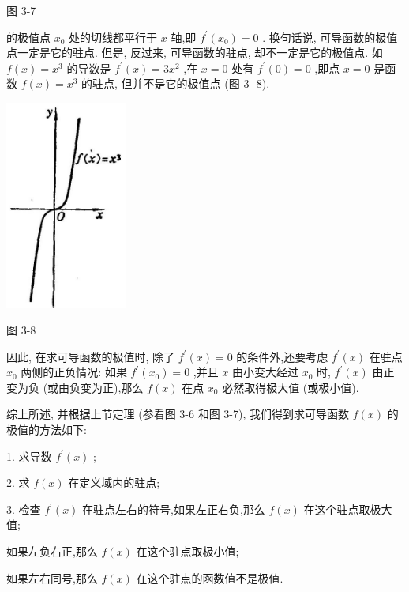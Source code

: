 \documentclass[lang=cn,newtx,12pt,scheme=chinese]{elegantbook}
\begin{document}
图 3-7

的极值点 \({x}_{0}\) 处的切线都平行于 \(x\) 轴,即 \({f}^{\prime }\left( {x}_{0}\right) = 0\) . 换句话说, 可导函数的极值点一定是它的驻点. 但是, 反过来, 可导函数的驻点, 却不一定是它的极值点. 如 \(f\left( x\right) = {x}^{3}\) 的导数是 \({f}^{\prime }\left( x\right) = 3{x}^{2}\) ,在 \(x = 0\) 处有 \({f}^{\prime }\left( 0\right) = 0\) ,即点 \(x = 0\) 是函数 \(f\left( x\right) = {x}^{3}\) 的驻点, 但并不是它的极值点 (图 3- 8).

\begin{center}
\includegraphics[max width=0.3\textwidth]{images/01912c18-5c3f-733d-b775-749ba9897a9d_141_203287.jpg}
\end{center}

图 3-8

因此, 在求可导函数的极值时, 除了 \({f}^{\prime }\left( x\right) = 0\) 的条件外,还要考虑 \({f}^{\prime }\left( x\right)\) 在驻点 \({x}_{0}\) 两侧的正负情况: 如果 \({f}^{\prime }\left( {x}_{0}\right) = 0\) ,并且 \(x\) 由小变大经过 \({x}_{0}\) 时, \({f}^{\prime }\left( x\right)\) 由正变为负 (或由负变为正),那么 \(f\left( x\right)\) 在点 \({x}_{0}\) 必然取得极大值 (或极小值).

\begin{proposition}[求解极值的方法]

综上所述, 并根据上节定理 (参看图 3-6 和图 3-7), 我们得到求可导函数 \(f\left( x\right)\) 的极值的方法如下:

1. 求导数 \({f}^{\prime }\left( x\right)\) ;

2. 求 \(f\left( x\right)\) 在定义域内的驻点;

3. 检查 \({f}^{\prime }\left( x\right)\) 在驻点左右的符号,如果左正右负,那么 \(f\left( x\right)\) 在这个驻点取极大值;

如果左负右正,那么 \(f\left( x\right)\) 在这个驻点取极小值;

如果左右同号,那么 \(f\left( x\right)\) 在这个驻点的函数值不是极值.

\end{proposition}
\end{document}
